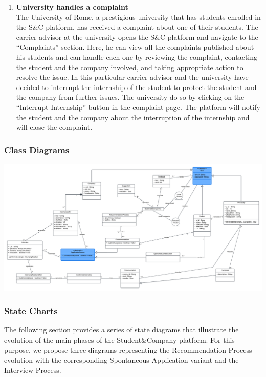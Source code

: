 \begin{enumerate}
    \item \textbf{\textcolor{titleColor}{University handles a complaint}}\\
        The University of Rome, a prestigious university that has students enrolled in the S\&C platform, has received a complaint about one of their students. The carrier advisor at the university opens the S\&C platform and navigate to the “Complaints” section. Here, he can view all the complaints published about his students and can handle each one by reviewing the complaint, contacting the student and the company involved, and taking appropriate action to resolve the issue.
        In this particular carrier advisor and the university have decided to interrupt the internship of the student to protect the student and the company from further issues. The university do so by clicking on the “Interrupt Internship” button in the complaint page. The platform will notify the student and the company about the interruption of the internship and will close the complaint.
\end{enumerate}


\subsubsection{Class Diagrams}
\includegraphics[width=\linewidth]{Diagrams/Class Diagrams/ClassDiagram1.1.png}

\subsubsection{State Charts}
The following section provides a series of state diagrams that illustrate the evolution of the main phases of the Student\&Company platform. For this purpose, we propose three diagrams representing the Recommendation Process evolution with the corresponding Spontaneous Application variant and the Interview Process.

